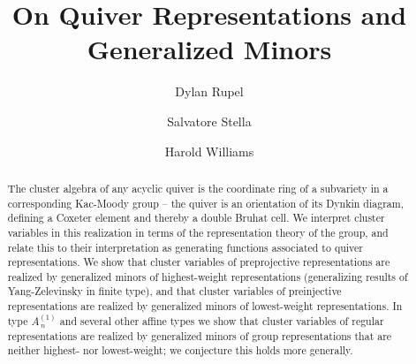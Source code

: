 \documentclass[12pt]{amsart}
\theoremstyle{remark}
\numberwithin{equation}{section}
\begin{document}
\title{On Quiver Representations and Generalized Minors}

\author[Rupel]{Dylan Rupel}
\address[Dylan Rupel]{University of Notre Dame}

\author[Stella]{Salvatore Stella}
\address[Salvatore Stella]{Universit\`a degli studi di Roma ``La Sapienza''}

\author[Williams]{Harold Williams}
\address[Harold Williams]{University of Texas at Austin}

\begin{abstract}
The cluster algebra of any acyclic quiver is the coordinate ring of a subvariety in a corresponding Kac-Moody group -- the quiver is an orientation of its Dynkin diagram, defining a Coxeter element and thereby a double Bruhat cell. We interpret cluster variables in this realization in terms of the representation theory of the group, and relate this to their interpretation as generating functions associated to quiver representations. We show that cluster variables of preprojective representations are realized by generalized minors of highest-weight representations (generalizing results of Yang-Zelevinsky in finite type), and that cluster variables of preinjective representations are realized by generalized minors of lowest-weight representations. In type $A_{\:n}^{(1)}$ and several other affine types we show that cluster variables of regular representations are realized by generalized minors of group representations that are neither highest- nor lowest-weight; we conjecture this holds more generally.




\end{abstract}
\end{document}
